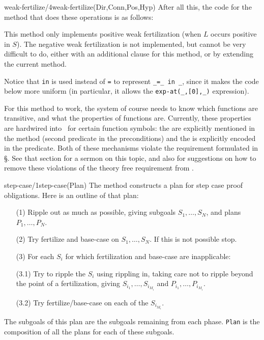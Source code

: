 \begin{method}{weak-fertilize/4}{weak-fertilize(Dir,Conn,Pos,Hyp)}
After all this, the code for the  method that
does these operations is as follows:
{\tiny
}

This method only implements positive weak fertilization (when $L$
occurs positive in $S$). The negative weak fertilization is not \notnice
implemented, but cannot be very difficult to do, either with an
additional clause for this method, or by extending the current
method.

Notice that {\tt in} is used instead of {\tt =} to represent
{\tt \_=\_ in \_}, since it makes the code below more uniform (in
particular, it allows the {\tt exp-at(\_,[0],\_)} expression).

For this method to work, the system of course needs to know which
functions are transitive, and what the  properties of
functions are. Currently, these properties are hardwired into \clam\
for certain function symbols: the  are explicitly
mentioned in the method (second predicate in the preconditions) and
the \inx{polarity} is explicitly encoded in the \p{polarity/5} predicate.
Both of these mechanisms violate the {\em \inx{theory free}\/}
requirement formulated in \S{}. See that
section for a sermon on this topic, and also for suggestions on how to
remove these violations of the theory free requirement from \clam.
\end{method}

\begin{method}{step-case/1}{step-case(Plan)}%
The  method constructs a plan for step
case proof obligations.   Here is an outline of that plan:
\begin{itemize}
\item [(1)] Ripple out as much as possible, giving subgoals
$S_1,\ldots,S_N$, and plans $P_1,\ldots,P_N$.
\item [(2)] Try fertilize and base-case on $S_1,\ldots,S_N$.  If this
is not possible stop. 
\item [(3)] For each $S_i$ for which fertilization and base-case are
inapplicable: 
\item [(3.1)] Try to ripple the $S_i$ using rippling in, taking care
not to ripple beyond the point of a fertilization, giving 
                $S_{i_1},\ldots,S_{i_{M_i}}$ and $P_{i_1},\ldots,P_{i_{M_i}}$.
    \item [(3.2)] Try fertilize/base-case on each of the $S_{i_{M_i}}$.
\end{itemize}
The subgoals of this plan are the subgoals remaining from each phase.  
{\tt Plan} is the composition of all the plans for each of these subgoals.

{\tiny 
}
\end{method}

